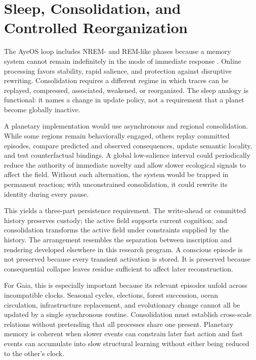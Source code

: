 \documentclass[11pt]{article}
\begin{document}
\section{Sleep, Consolidation, and Controlled Reorganization}

The AyeOS loop includes NREM- and REM-like phases because a memory system cannot remain indefinitely in the mode of immediate response \cite{flyxionOverview}. Online processing favors stability, rapid salience, and protection against disruptive rewriting. Consolidation requires a different regime in which traces can be replayed, compressed, associated, weakened, or reorganized. The sleep analogy is functional: it names a change in update policy, not a requirement that a planet become globally inactive.

A planetary implementation would use asynchronous and regional consolidation. While some regions remain behaviorally engaged, others replay committed episodes, compare predicted and observed consequences, update semantic locality, and test counterfactual bindings. A global low-salience interval could periodically reduce the authority of immediate novelty and allow slower ecological signals to affect the field. Without such alternation, the system would be trapped in permanent reaction; with unconstrained consolidation, it could rewrite its identity during every pause.

This yields a three-part persistence requirement. The write-ahead or committed history preserves custody; the active field supports current cognition; and consolidation transforms the active field under constraints supplied by the history. The arrangement resembles the separation between inscription and rendering developed elsewhere in this research program. A conscious episode is not preserved because every transient activation is stored. It is preserved because consequential collapse leaves residue sufficient to affect later reconstruction.

For Gaia, this is especially important because its relevant episodes unfold across incompatible clocks. Seasonal cycles, elections, forest succession, ocean circulation, infrastructure replacement, and evolutionary change cannot all be updated by a single synchronous routine. Consolidation must establish cross-scale relations without pretending that all processes share one present. Planetary memory is coherent when slower events can constrain later fast action and fast events can accumulate into slow structural learning without either being reduced to the other's clock.
\end{document}
